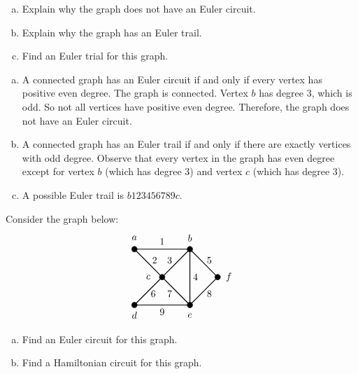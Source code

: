 \documentclass[12pt,letterpaper]{exam}
\begin{document}
\begin{questions}
\begin{enumerate}[(a)]
\item Explain why the graph does not have an Euler circuit. 
\item Explain why the graph has an Euler trail. 
\item Find an Euler trial for this graph. 
\end{enumerate} \pspace

\sol 
\begin{enumerate}[(a)]
\item A connected graph has an Euler circuit if and only if every vertex has positive even degree. The graph is connected. Vertex $b$ has degree 3, which is odd. So not all vertices have positive even degree. Therefore, the graph does not have an Euler circuit. \pspace

\item A connected graph has an Euler trail if and only if there are exactly vertices with odd degree. Observe that every vertex in the graph has even degree except for vertex $b$ (which has degree 3) and vertex $c$ (which has degree 3). \pspace

\item A possible Euler trail is $b123456789c$.
\end{enumerate}



\newpage
\question[10] Consider the graph below:
	\[
	\begin{tikzpicture}
	\draw[line width=0.03cm] (2,2) -- (3,1) -- (2,0) -- (2,2) -- (0,2) -- (1,1) -- (0,0) -- (2,0) -- (1,1) -- (2,2);
	
	\draw[fill=black] (0,0) circle (0.1);
	\draw[fill=black] (2,0) circle (0.1);
	\draw[fill=black] (0,2) circle (0.1);
	\draw[fill=black] (2,2) circle (0.1);
	\draw[fill=black] (1,1) circle (0.1);
	\draw[fill=black] (3,1) circle (0.1);
	
	\node at (0,2.4) {$a$};
	\node at (2,2.4) {$b$};
	\node at (0.5,1) {$c$};
	\node at (0,-0.36) {$d$};
	\node at (2,-0.38) {$e$};
	\node at (3.4,1) {$f$};
	
	\node at (1,2.27) {$1$};
	\node at (0.73,1.6) {$2$};
	\node at (1.27,1.6) {$3$};
	\node at (2.2,1) {$4$};
	\node at (2.7,1.6) {$5$};
	\node at (0.68,0.4) {$6$};
	\node at (1.27,0.4) {$7$};
	\node at (2.7,0.4) {$8$};
	\node at (1,-0.25) {$9$};
	\end{tikzpicture}
	\]

\begin{enumerate}[(a)]
\item Find an Euler circuit for this graph. 
\item Find a Hamiltonian circuit for this graph. 
\end{enumerate} \pspace


\end{questions}
\end{document}
